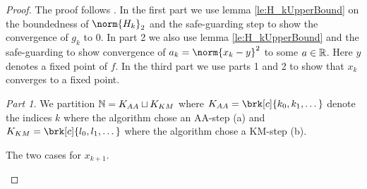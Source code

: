 \begin{proof}
The proof follows \cite[Theorem 6]{ZhaAA}. In the first part we use lemma \ref{le:H_kUpperBound} on the boundedness of $\norm{H_k}_2$ and the safe-guarding step to show the convergence of $g_k$ to $0$. In part 2 we also use lemma \ref{le:H_kUpperBound} and the safe-guarding to show convergence of $a_k=\norm{x_k-y}^2$ to some $a\in\mathbb{R}$. Here $y$ denotes a fixed point of $f$. In the third part we use parts 1 and 2 to show that $x_k$ converges to a fixed point.

\textit{Part 1.}
We partition $\mathbb{N}=K_{AA}\sqcup K_{KM}$ where $K_{AA}=\brk[c]{k_0,k_1,\dots}$ denote the indices $k$ where the algorithm chose an AA-step (a) and $K_{KM}=\brk[c]{l_0,l_1,\dots}$ where the algorithm chose a KM-step (b).

\begin{center}
\begin{algorithm}[H]
\caption{The two cases for $x_{k+1}$.}
\end{algorithm}
\end{center}


\end{proof}

